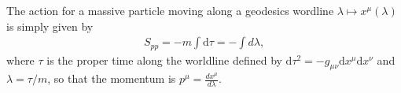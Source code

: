 \begin{mytheorem}
\end{mytheorem}

\begin{mytheorem}
\end{mytheorem}







{\color{red}

\begin{mytheorem}
The action for a massive particle moving along a geodesics wordline $\lambda \mapsto x^\mu(\lambda)$ is simply given by
\begin{align}
    S_{pp}=-m\int \mathrm{d}\tau = -\int d\lambda,
\end{align}
where $\tau$ is the proper time along the worldline defined by $\mathrm{d}\tau^2 = - g_{\mu\nu} \mathrm{d}x^\mu \mathrm{d}x^\nu$ and $\lambda =\tau/m$, so that the momentum is $p^\mu = \frac{dx^\mu}{d\lambda}$.


\end{mytheorem}}

